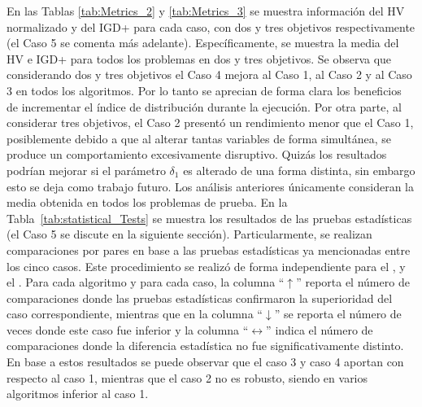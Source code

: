 En las Tablas \ref{tab:Metrics_2} y \ref{tab:Metrics_3} se muestra información del HV normalizado \cite{zitzler1999multiobjective} y del IGD+ \cite{Joel:IGDPlus_And_GDPlus} para cada caso, con
dos y tres objetivos respectivamente (el Caso 5 se comenta más adelante).
%
Específicamente, se muestra la media del HV e IGD+ para todos los problemas en dos y tres objetivos.
%
Se observa que considerando dos y tres objetivos el Caso 4 mejora al Caso 1, al Caso 2 y al Caso 3 en todos los algoritmos.
%
Por lo tanto se aprecian de forma clara los beneficios de incrementar el índice de distribución durante la ejecución.
%
Por otra parte, al considerar tres objetivos, el Caso 2 presentó un rendimiento menor que el Caso 1, 
posiblemente debido a que al alterar tantas variables de forma simultánea, se produce un comportamiento excesivamente disruptivo.
%
Quizás los resultados podrían mejorar si el parámetro $\delta_1$ es alterado de una forma distinta, sin embargo esto se deja como trabajo futuro.
%
Los análisis anteriores únicamente consideran la media obtenida en todos los problemas de prueba.
%
En la Tabla~\ref{tab:statistical_Tests} se muestra los resultados de las pruebas estadísticas (el Caso 5 se discute en la siguiente sección).
%
Particularmente, se realizan comparaciones por pares en base a las pruebas estadísticas ya mencionadas entre los cinco casos.
%
Este procedimiento se realizó de forma independiente para el \NSGAII{}, \MOEAD{} y el \SMSEMOA{}.
%
Para cada algoritmo y para cada caso, la columna ``$\uparrow$'' reporta el número de comparaciones donde las pruebas estadísticas confirmaron 
la superioridad del caso correspondiente, mientras que en la columna ``$\downarrow$'' se reporta el número de veces donde este caso fue inferior 
y la columna ``$\longleftrightarrow$'' indica el número de comparaciones donde la diferencia estadística no fue significativamente distinto.
%
En base a estos resultados se puede observar que el caso 3 y caso 4 aportan con respecto al caso 1, mientras que el caso 2 no es
robusto, siendo en varios algoritmos inferior al caso 1.
%
%
